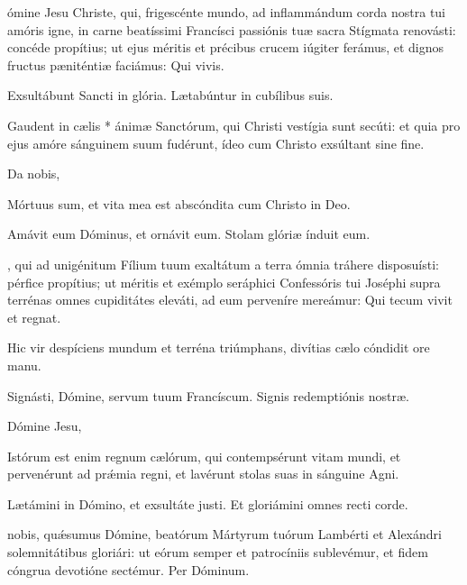\documentclass[fontsize=9pt,paper=A6,twoside,BCOR=1mm,DIV=22,headinclude]{scrarticle}
\begin{document}
\begin{multicols}{2}
{
ómine Jesu Christe, qui, frigescénte mundo, ad inflammándum corda nostra tui amóris igne, in carne beatíssimi Francísci passiónis tuæ sacra Stígmata renovásti: concéde propítius; ut ejus méritis et précibus crucem iúgiter ferámus, et dignos fructus pæniténtiæ faciámus: Qui vivis.


\V Exsultábunt Sancti in glória.
\R Lætabúntur in cubílibus suis.

 Gaudent in cælis * ánimæ Sanctórum, qui Christi vestígia sunt secúti: et quia pro ejus amóre sánguinem suum fudérunt, ídeo cum Christo exsúltant sine fine.

 Da nobis, 


\A Mórtuus sum, et vita mea est abscóndita cum Christo in Deo.

\V Amávit eum Dóminus, et ornávit eum.
\R Stolam glóriæ índuit eum.

, qui ad unigénitum Fílium tuum exaltátum a terra ómnia tráhere disposuísti: pérfice propítius; ut méritis et exémplo seráphici Confessóris tui Joséphi supra terrénas omnes cupiditátes eleváti, ad eum perveníre mereámur: \red{(}Qui tecum vivit et regnat.\red{)}


\A Hic vir despíciens mundum et terréna triúmphans, divítias cælo cóndidit ore manu.

\V Signásti, Dómine, servum tuum Francíscum.
\R Signis redemptiónis nostræ.

 Dómine Jesu, 

}


{

\A Istórum est enim regnum cælórum, qui contempsérunt vitam mundi, et pervenérunt ad pr\'æmia regni, et lavérunt stolas suas in sánguine Agni.

\V Lætámini in Dómino, et exsultáte justi.
\R Et gloriámini omnes recti corde.

 nobis, qu\'æsumus Dómine, beatórum Mártyrum tu\-ó\-rum Lambérti et Alexándri solemnitátibus gloriári: ut eórum semper et patrocíniis sublevémur, et fidem cóngrua devotióne sectémur. Per Dóminum.

}
\end{multicols}
\end{document}
